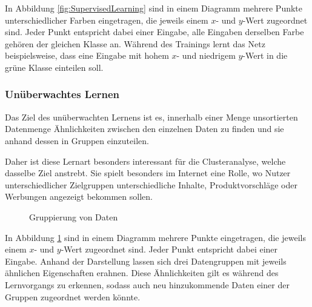 \documentclass[12pt,a4]{article}
\begin{document}
In Abbildung \ref{fig:SupervisedLearning} sind in einem Diagramm mehrere Punkte unterschiedlicher Farben eingetragen, die jeweils einem $x$- und $y$-Wert zugeordnet sind. Jeder Punkt entspricht dabei einer Eingabe, alle Eingaben derselben Farbe gehören der gleichen Klasse an. Während des Trainings lernt das Netz beispielsweise, dass eine Eingabe mit hohem $x$- und niedrigem $y$-Wert in die grüne Klasse einteilen soll.

\subsubsection{Unüberwachtes Lernen}\label{sec:UnsupervisedLearning}
Das Ziel des unüberwachten Lernens ist es, innerhalb einer Menge unsortierten Datenmenge Ähnlichkeiten zwischen den einzelnen Daten zu finden und sie anhand dessen in Gruppen einzuteilen.

Daher ist diese Lernart besonders interessant für die Clusteranalyse, welche dasselbe Ziel anstrebt. Sie spielt besonders im Internet eine Rolle, wo Nutzer unterschiedlicher Zielgruppen unterschiedliche Inhalte, Produktvorschläge oder Werbungen angezeigt bekommen sollen.

\begin{figure}[!h]
\centering
{}
\caption{Gruppierung von Daten}
\label{fig:UnsupervisedLearning}
\end{figure}

In Abbildung \ref{fig:UnsupervisedLearning} sind in einem Diagramm mehrere Punkte eingetragen, die jeweils einem $x$- und $y$-Wert zugeordnet sind. Jeder Punkt entspricht dabei einer Eingabe. Anhand der Darstellung lassen sich drei Datengruppen mit jeweils ähnlichen Eigenschaften erahnen. Diese Ähnlichkeiten gilt es während des Lernvorgangs zu erkennen, sodass auch neu hinzukommende Daten einer der Gruppen zugeordnet werden könnte.
\end{document}
